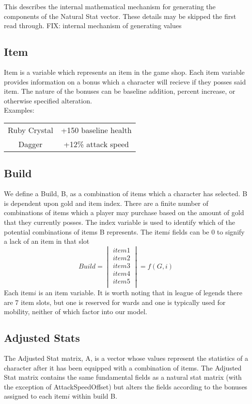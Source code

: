 \documentclass{article}
\begin{document}
This describes the  internal mathematical mechanism for generating the components of the Natural Stat vector.  These details may be skipped the first read through.
FIX: internal mechanism of generating values
\subsection{Item}
Item is a variable which represents an item in the game shop.  Each item variable provides information on a bonus which a character will recieve if they posses said item. The nature of the bonuses can be baseline addition, percent increase, or otherwise specified alteration.\\  Examples:\\
\begin{tabular}{|c|c|}
Ruby Crystal & +150  baseline health \\
Dagger &  +12\% attack speed
\end{tabular}
\subsection{Build}
We define a Build, B, as a combination of items which a character has selected.  B is dependent upon gold and item index.  There are a finite number of combinations of items which a player may purchase based on the amount of gold that they currently posses.  The index variable is used to identify which of the potential combinations of items B represents.  The item$i$ fields can be 0 to signify a lack of an item in that slot
\begin{equation}
	Build = 
\begin{vmatrix}
	item1\\
	item2\\
	item3\\
	item4\\
	item5\\
\end{vmatrix}=
f(G,i)
\end{equation}
Each item$i$ is an item variable. It is worth noting that in  league of legends there are 7 item slots, but one is reserved for wards and one is typically used for mobility, neither of which  factor into our model.

\subsection{Adjusted Stats}
The Adjusted Stat matrix, A, is a vector whose values represent the statistics of a character after it has been equipped with a combination of items.  The Adjusted Stat matrix contains the same fundamental fields as a natural stat matrix (with the exception of AttackSpeedOffset)  but alters the fields according to the bonuses assigned to each item$i$ within build B.
\end{document}
